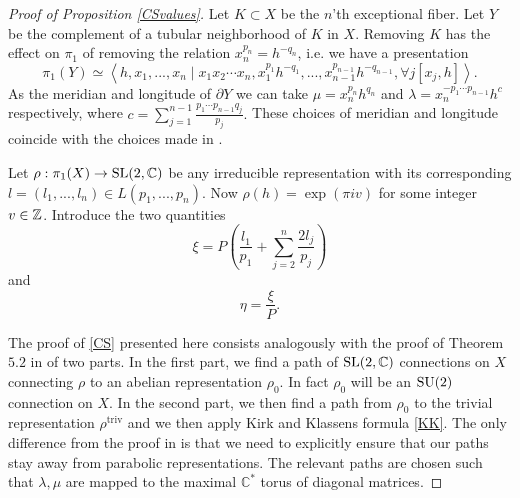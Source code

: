  
\begin{proof}[Proof of Proposition \ref{CSvalues}]
Let $K\subset X$ be the $n$'th exceptional fiber. Let $Y$ be the complement of a tubular neighborhood of $K$ in $X.$ Removing $K$ has the effect on $\pi_1$ of removing the relation $x_n^{p_n}=h^{-q_n}$, i.e. we have a presentation
\begin{equation} \label{presentation2}
\pi_1(Y) \simeq \left\langle h,  x_1,...,x_n \mid  x_1x_2\cdots x_n, x_1^{p_1}h^{-q_1},...,x_{n-1}^{p_{n-1}}h^{-q_{n-1}} , \forall j [x_j,h]   \right\rangle.
\end{equation}
As the meridian and longitude of $\partial Y$ we can take $\mu=x_n^{p_n}h^{q_n}$ and $\lambda=x_n^{-p_1\cdots p_{n-1}}h^c$ respectively, where $c=\sum_{j=1}^{n-1} \frac{p_1\cdots p_{n-1}q_j}{p_j}.$ These choices of meridian and longitude coincide with the choices made in \cite{FintushelStern90}.

Let $\rho:\pi_1(X)\rightarrow \operatorname{SL}(2,\mathbb{C})$ be any irreducible representation with its corresponding $l=(l_1,...,l_n) \in L(p_1,...,p_n)$. Now $\rho(h)=\exp(\pi i v)$ for some integer $v\in \mathbb{Z}$.
 Introduce the two quantities 
 $$\xi= P\left(\frac{l_1}{p_1}+\sum_{j=2}^{n} \frac{2l_j}{p_j}\right)$$ and $$\eta=\frac{\xi}{P}.$$


The proof of \eqref{CS} presented here consists analogously with the proof of Theorem $5.2$ in \cite{KirkKlassen90} of two parts. In the first part, we find a path of $\operatorname{SL}(2,\mathbb{C})$ connections on $X$ connecting $\rho$ to an abelian representation $\rho_0$. In fact $\rho_0$ will be an $\operatorname{SU}(2)$ connection on $X.$  In the second part, we then find a path from $\rho_0$ to the trivial representation $\rho^{\text{triv}}$ and we then apply Kirk and Klassens formula \eqref{KK}. The only difference from the proof in \cite{KirkKlassen90} is that we need to explicitly ensure that our paths stay away from parabolic representations. The relevant paths are chosen such that $\lambda,\mu$ are mapped to the maximal $\mathbb{C}^*$ torus of diagonal matrices. 



\end{proof}
